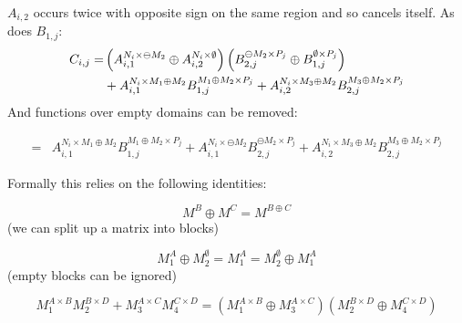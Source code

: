 \documentclass{letter}
\begin{document}
$A_{i,2}$ occurs twice with opposite sign on the same region and so cancels itself. As does $B_{1,j}$:
\begin{align}
	C_{i,j} 	=& \left( A_{i,1}^{N_i \times \ominus M_2} \oplus  A_{i,2}^{N_i \times \emptyset}  \right)
			\left(  B_{2,j}^{\ominus M_2 \times P_j} \oplus B_{1,j}^{\emptyset \times P_j} \right)\notag\\
			&+ A_{i,1}^{N_i \times M_1 \oplus M_2} B_{1,j}^{M_1 \oplus M_2 \times P_j} 
			+ A_{i,2}^{N_i \times M_3 \oplus M_2} B_{2,j}^{M_3 \oplus M_2 \times P_j} 
\end{align}
And functions over empty domains can be removed:

\begin{align}
			= & A_{i,1}^{N_i \times M_1 \oplus M_2} B_{1,j}^{M_1 \oplus M_2 \times P_j} 
			+ A_{i,1}^{N_i \times \ominus M_2} B_{2,j}^{\ominus M_2 \times P_j}
			+ A_{i,2}^{N_i \times M_3 \oplus M_2} B_{2,j}^{M_3 \oplus M_2 \times P_j}
\end{align}


Formally this relies on the following identities:

\begin{equation}
	M^B \oplus M^C = M^{B\oplus C}
\end{equation}
(we can split up a matrix into blocks)

\begin{equation}
	M_1^A \oplus M_2^\emptyset = M_1^A = M_2^\emptyset \oplus M_1^A
\end{equation}
(empty blocks can be ignored)

\begin{equation}
	M_1^{A \times B} M_2^{B \times D} + M_3^{A \times C} M_4^{C \times D} 
	= \left(M_1^{A\times B} \oplus M_3^{A \times C} \right) \left( M_2^{B \times D} \oplus M_4^{C \times D} \right)
\end{equation}
\end{document}
